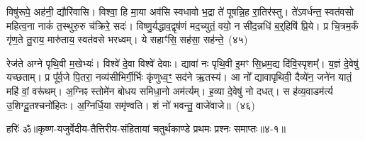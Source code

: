 विषु॑रूपे॒ अह॑नी॒ द्यौरि॑वासि। विश्वा॒ हि मा॒या अव॑सि स्वधावो भ॒द्रा ते॑ पूषन्नि॒ह रा॒तिर॑स्तु। ते॑\-ऽवर्धन्त॒ स्वत॑वसो महित्व॒ना नाकं॑ त॒स्थुरु॒रु च॑क्रिरे॒ सदः॑। विष्णु॒र्यद्धाव॒द्वृष॑णं मद॒च्युतं॒ वयो॒ न सी॑द॒न्नधि॑ ब॒र्॒\mbox{}हिषि॑ प्रि॒ये। प्र चि॒त्रम॒र्कं गृ॑ण॒ते तु॒राय॒ मारु॑ताय॒ स्वत॑वसे भरध्वम्। ये सहाꣳ॑सि॒ सह॑सा॒ सह॑न्ते॒~(४५)\ip

रेज॑ते अग्ने पृथि॒वी म॒खेभ्यः॑। विश्वे॑ दे॒वा विश्वे॑ देवाः। द्यावा॑ नः पृथि॒वी इ॒मꣳ सि॒ध्रम॒द्य दि॑वि॒स्पृशम्᳚। य॒ज्ञं दे॒वेषु॑ यच्छताम्। प्र पू᳚र्व॒जे पि॒तरा॒ नव्य॑सीभिर्गी॒र्भिः कृ॑णुध्व॒ꣳ॒ सद॑ने ऋ॒तस्य॑। आ नो᳚ द्यावा\-पृथिवी॒ दैव्ये॑न॒ जने॑न यातं॒ महि॑ वां॒ वरू॑थम्। अ॒ग्निꣴ स्तोमे॑न बोधय समिधा॒नो अम॑र्त्यम्। ह॒व्या दे॒वेषु॑ नो दधत्। स ह॑व्य॒वाडम॑र्त्य उ॒शिग्दू॒तश्चनो॑हितः। अ॒ग्निर्धि॒या समृ॑ण्वति। शं नो॑ भवन्तु॒ वाजे॑वाजे॥~(४६)\ip

{\anuvakamend[{पू॒रु॒ष॒त्वता॑ यज॒तन्ते॑ अ॒न्यथ्सह॑न्ते॒ चनो॑हितो॒\-ऽष्टौ च॑}]}%

{हरिः॑ ॐ}{॥कृष्ण-यजुर्वेदीय-तैत्तिरीय-संहितायां चतुर्थकाण्डे प्रथमः प्रश्नः समाप्तः॥४-१॥}


